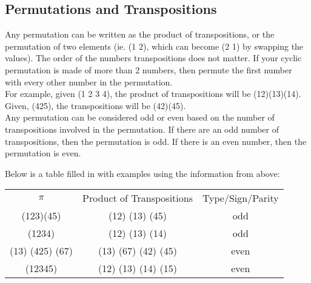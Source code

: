 \subsection{Permutations and Transpositions}

Any permutation can be written as the product of transpositions, 
or the permutation of two elements (ie. (1 2), which can become (2 1) by swapping
the values). The order of the numbers transpositions does not matter. If your cyclic
permutation is made of more than 2 numbers, then permute the ﬁrst number
 with every other number in the permutation. \\

For example, given (1 2 3 4), the product of transpositions will be (12)(13)(14).
Given, (425), the transpositions will be (42)(45).\\

Any permutation can be considered odd or even based on the number of
transpositions involved in the permutation. If there are an odd number of
transpositions, then the permutation is odd. If there is an even number,
then the permutation is even.

Below is a table ﬁlled in with examples using the information from
above:
\begin{center}
    \begin{tabular}{ccc}
        $\pi$ & Product of Transpositions & Type/Sign/Parity\\
        (123)(45) & (12) (13) (45)  & odd\\
(1234) & (12) (13) (14) & odd\\
(13) (425) (67)&  (13) (67) (42) (45) & even\\
(12345) & (12) (13) (14) (15)&  even
    \end{tabular}
\end{center}

